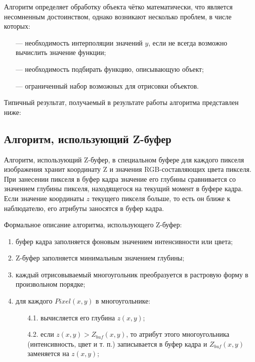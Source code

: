 \begin{enumerate}
Алгоритм определяет обработку объекта чётко математически, что является несомненным достоинством, однако возникают несколько проблем, в числе которых: 
\begin{itemize}
	\item[---] необходимость интерполяции значений $y$, если не всегда возможно вычислить значение функции;
	\item[---] необходимость подбирать функцию, описывающую объект;
	\item[---] ограниченный набор возможных для отрисовки объектов.
\end{itemize}

Типичный результат, получаемый в результате работы алгоритма представлен ниже:


\subsection{Алгоритм, использующий Z-буфер}

Алгоритм, использующий Z-буфер, в специальном буфере для каждого пикселя изображения хранит координату Z и значения RGB-составляющих цвета пикселя. При занесении пикселя в буфер кадра значение его глубины сравнивается со значением глубины пикселя, находящегося на текущий момент в буфере кадра. Если значение координаты $z$ текущего пикселя больше, то есть он ближе к наблюдателю, его атрибуты заносятся в буфер кадра.

Формальное описание алгоритма, использующего Z-буфер:
\begin{enumerate}
	\item буфер кадра заполняется фоновым значением интенсивности или цвета;
	\item Z-буфер заполняется минимальным значением глубины;
	\item каждый отрисовываемый многоугольник преобразуется в растровую форму в произвольном порядке;
	\item для каждого $Pixel(x, y)$ в многоугольнике:
	\begin{enumerate}
		\item[4.1.] вычисляется его глубина $z(x, y)$;
		\item[4.2.] если $z(x, y) > Z_{buf}(x, y)$, то атрибут этого многоугольника (интенсивность, цвет и т. п.) записывается в буфер кадра и $Z_{buf}(x, y)$ заменяется на $z(x, y)$;
	\end{enumerate}
\end{enumerate}  


\end{enumerate}
